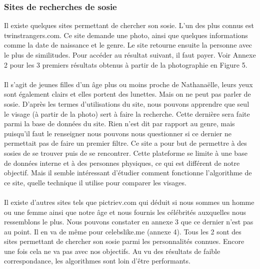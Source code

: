 \documentclass[a4paper,12pt]{article}
\begin{document}
\subsubsection{Sites de recherches de sosie}
Il existe quelques sites permettant de chercher son sosie. L'un des plus connus est twinstrangers.com. Ce site demande une photo, ainsi que quelques informations comme la date de naissance et le genre. Le site retourne ensuite la personne avec le plus de similitudes. Pour accéder au résultat suivant, il faut payer. 
Voir Annexe 2 pour les 3 premiers résultats obtenus à partir de la photographie en Figure 5. \\ \\
Il s'agit de jeunes filles d'un âge plus ou moins proche de Nathanaëlle, leurs yeux sont également clairs et elles portent des lunettes. Mais on ne peut pas parler de sosie. D'après les termes d'utilisations du site, nous pouvons apprendre que seul le visage (à partir de la photo) sert à faire la recherche. Cette dernière sera faite parmi la base de données du site. Rien n'est dit par rapport au genre, mais puisqu'il faut le renseigner nous pouvons nous questionner si ce dernier ne permettait pas de faire un premier filtre. Ce site a pour but de permettre à des sosies de se trouver puis de se rencontrer. Cette plateforme se limite à une base de données interne et à des personnes physiques, ce qui est différent de notre objectif.
Mais il semble intéressant d'étudier comment fonctionne l'algorithme de ce site, quelle technique il utilise pour comparer les visages. 
\\\\
Il existe d'autres sites tels que pictriev.com qui déduit si nous sommes un homme ou une femme ainsi que notre âge et nous fournis les célébrités auxquelles nous ressemblons le plus. Nous pouvons constater en annexe 3 que ce dernier n'est pas au point. Il en va de même pour celebslike.me (annexe 4). Tous les 2 sont des sites permettant de chercher son sosie parmi les personnalités connues. Encore une fois cela ne va pas avec nos objectifs. Au vu des résultats de faible correspondance, les algorithmes sont loin d'être performants.
\end{document}
